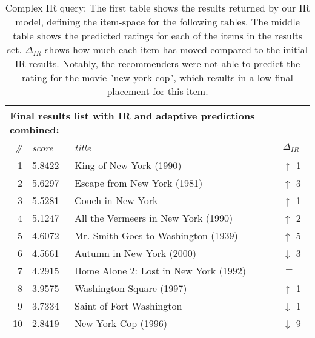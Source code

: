 \begin{table}[h]
  \begin{tabular*}{0.9\textwidth}{ r l p{8.5cm} l }
    \multicolumn{4}{l}{Final results list with IR and adaptive predictions combined:}\\
    \toprule
    \emph{\#} & \emph{score} & \emph{title} & $\Delta_{IR}$ \\
    \midrule
    1 & 5.8422  &  King of New York (1990)                & \color{green} $\uparrow$ 1 \\
    2 & 5.6297  &  Escape from New York (1981)            & \color{green} $\uparrow$ 3 \\
    3 & 5.5281  &  Couch in New York                      & \color{green} $\uparrow$ 1 \\
    4 & 5.1247  &  All the Vermeers in New York (1990)    & \color{green} $\uparrow$ 2 \\
    5 & 4.6072  &  Mr. Smith Goes to Washington (1939)    & \color{green} $\uparrow$ 5 \\
    6 & 4.5661  &  Autumn in New York (2000)              & \color{red} $\downarrow$ 3 \\
    7 & 4.2915  &  Home Alone 2: Lost in New York (1992)  & \color{black} $=$ \\
    8 & 3.9575  &  Washington Square (1997)               & \color{green} $\uparrow$ 1 \\
    9 & 3.7334  &  Saint of Fort Washington               & \color{red} $\downarrow$ 1 \\
    10& 2.8419  &  New York Cop (1996)                    & \color{red} $\downarrow$ 9 \\
    \bottomrule
  \end{tabular*}

  \vspace{1em}
  \caption[Complex IR Query]{
    Complex IR query:
    The first table shows the results returned by our IR model, defining the item-space for the following tables.
    The middle table shows the predicted ratings for each of the items in the results set.
    $\Delta_{IR}$ shows how much each item has moved compared to the initial IR results.
    Notably, the recommenders were not able to predict the rating for the movie "new york cop",
    which results in a low final placement for this item.
  }
  \label{table:rank:washington}
\end{table}

